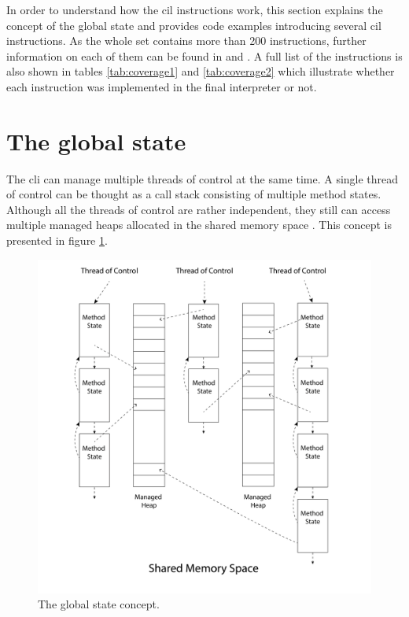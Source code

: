 \documentclass[declaration,shortabstract,english,mgr]{iithesis}
\begin{document}
In order to understand how the \acrshort{cil} instructions work, this section explains the concept of the global state and provides code examples introducing several \acrshort{cil} instructions. As the whole set contains more than 200 instructions, further information on each of them can be found in \cite{ecmaStandard} and \cite{isoStandard}. A full list of the instructions is also shown in tables \ref{tab:coverage1} and \ref{tab:coverage2} which illustrate whether each instruction was implemented in the final interpreter or not.

\section{The global state}
\label{sec:global_state}

The \acrshort{cli} can manage multiple threads of control at the same time. A single thread of control can be thought as a call stack consisting of multiple method states. Although all the threads of control are rather independent, they still can access multiple managed heaps allocated in the shared memory space \cite{ecmaStandard}. This concept is presented in figure \ref{fig:global_state}.

\begin{figure}
	\includegraphics[width=1\textwidth]{global_state.png}
    \centering
    \caption{The global state concept.}
    \label{fig:global_state}
\end{figure}
\end{document}

